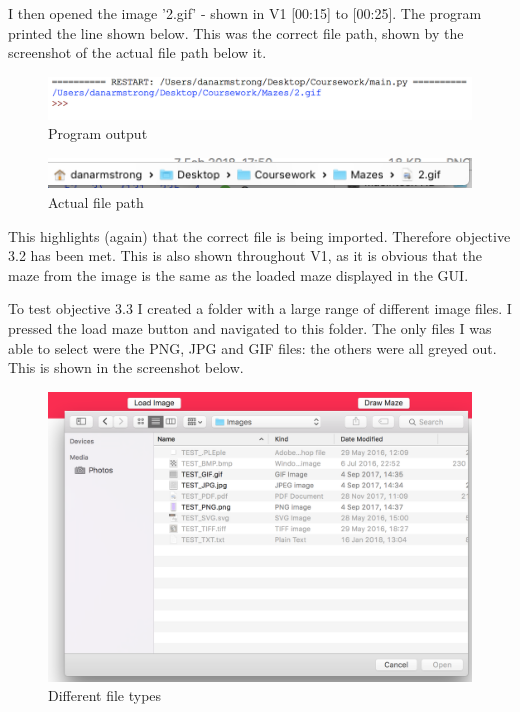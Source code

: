 \documentclass[titlepage]{article}
\begin{document}
I then opened the image '2.gif' - shown in V1 [00:15] to [00:25]. The program printed the line shown below. This was the correct file path, shown by the screenshot of the actual file path below it.

\begin{figure}[H]
  \centering
  \includegraphics[width=12cm]{322.png}
  \caption{Program output}
  \label{fig:dijk}
\end{figure}

\begin{figure}[H]
  \centering
  \includegraphics[width=12cm]{323.png}
  \caption{Actual file path}
  \label{fig:dijk}
\end{figure}

This highlights (again) that the correct file is being imported. Therefore objective 3.2 has been met. This is also shown throughout V1, as it is obvious that the maze from the image is the same as the loaded maze displayed in the GUI.

To test objective 3.3 I created a folder with a large range of different image files. I pressed the load maze button and navigated to this folder. The only files I was able to select were the PNG, JPG and GIF files: the others were all greyed out. This is shown in the screenshot below.

\begin{figure}[H]
  \centering
  \includegraphics[width=12cm]{331.png}
  \caption{Different file types}
  \label{fig:dijk}
\end{figure}
\end{document}
